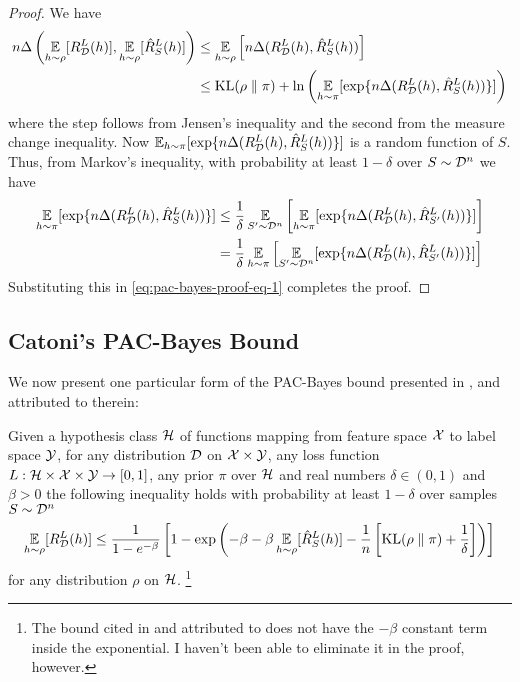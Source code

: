 \begin{proof}
  We have
  \begin{equation}
    \label{eq:pac-bayes-proof-eq-1}
    \begin{split}
      n \Delta\left(\operatorname*{\mathbb{E}}_{h \sim \rho}[R_{\mathcal{D}}^L(h)], \operatorname*{\mathbb{E}}_{h \sim
      \rho}[\hat{R}_S^L(h)]\right)
      &\leq \operatorname*{\mathbb{E}}_{h \sim \rho}\left[n \Delta(R_{\mathcal{D}}^L(h), \hat{R}_S^L(h))\right]
      \\
      &\leq \text{KL}(\rho \parallel \pi) + \ln\left(\operatorname*{\mathbb{E}}_{h \sim \pi}[\exp\{n
      \Delta(R_{\mathcal{D}}^L(h), \hat{R}_S^L(h))\}]\right)
    \end{split}
  \end{equation}
  where the step follows from Jensen's inequality and the second from the
  measure change inequality. Now $\operatorname*{\mathbb{E}}_{h \sim \pi}[\exp\{n \Delta(R_{\mathcal{D}}^L(h),
  \hat{R}_S^L(h))\}]$ is a random function of $S$. Thus, from Markov's
  inequality, with probability at least $1 - \delta$ over $S \sim \mathcal{D}^n$ we have
  \begin{equation}
    \begin{split}
      \operatorname*{\mathbb{E}}_{h \sim \pi}[\exp\{n \Delta(R_{\mathcal{D}}^L(h), \hat{R}_S^L(h))\}]
      &\leq \frac{1}{\delta} \operatorname*{\mathbb{E}}_{S' \sim \mathcal{D}^n}\left[\operatorname*{\mathbb{E}}_{h \sim \pi}[\exp\{n
      \Delta(R_{\mathcal{D}}^L(h), \hat{R}_{S'}^L(h))\}]\right] \\
      &= \frac{1}{\delta} \operatorname*{\mathbb{E}}_{h \sim \pi}\left[\operatorname*{\mathbb{E}}_{S' \sim \mathcal{D}^n}[\exp\{n
      \Delta(R_{\mathcal{D}}^L(h), \hat{R}_{S'}^L(h))\}]\right]
    \end{split}
  \end{equation}
  Substituting this in \eqref{eq:pac-bayes-proof-eq-1} completes the proof.
\end{proof}

\subsection{Catoni's PAC-Bayes Bound}

We now present one particular form of the PAC-Bayes bound presented in
\cite{germain2016pac}, and attributed to \cite{catoni2007pac} therein:

\begin{theorem}
  \label{thm:catoni}
  Given a hypothesis class $\mathcal{H}$ of functions mapping from feature space $\mathcal{X}$
  to label space $\mathcal{Y}$, for any distribution $\mathcal{D}$ on $\mathcal{X} \times \mathcal{Y}$, any loss
  function $L : \mathcal{H} \times \mathcal{X} \times \mathcal{Y} \to [0, 1]$, any prior $\pi$ over
  $\mathcal{H}$ and real numbers $\delta \in (0, 1)$ and $\beta > 0$ the following
  inequality holds with probability at least $1 - \delta$ over samples $S \sim
  \mathcal{D}^n$
  \begin{equation}
    \label{eq:catoni-bound-unit}
    \operatorname*{\mathbb{E}}_{h \sim \rho}[R_{\mathcal{D}}^L(h)] \leq \frac{1}{1 - e^{-\beta}} \left[1 -
    \exp\left( - \beta - \beta \operatorname*{\mathbb{E}}_{h \sim \rho}[\hat{R}_S^L(h)] - \frac{1}{n}
    \left[\text{KL}(\rho \parallel \pi) + \frac{1}{\delta}\right]\right)\right]
  \end{equation}
  for any distribution $\rho$ on $\mathcal{H}$. \footnote{The bound cited in
  \cite{germain2016pac} and attributed to \cite{catoni2007pac} does not have the
  $-\beta$ constant term inside the exponential. I haven't been able to
  eliminate it in the proof, however.}
\end{theorem}

